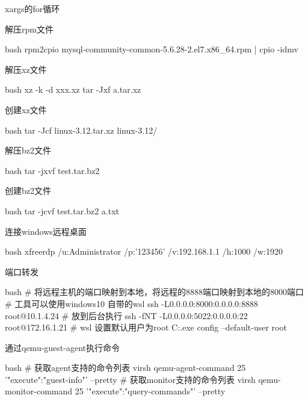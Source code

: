 \begin{outline}[enumerate]
\1 xargs的for循环

\1 解压rpm文件
\begin{code-block}{bash}
rpm2cpio mysql-community-common-5.6.28-2.el7.x86_64.rpm | cpio -idmv
\end{code-block}

\1 解压xz文件
\begin{code-block}{bash}
xz -k -d xxx.xz
tar -Jxf a.tar.xz
\end{code-block}

\1 创建xz文件
\begin{code-block}{bash}
tar -Jcf linux-3.12.tar.xz linux-3.12/
\end{code-block}

\1 解压bz2文件
\begin{code-block}{bash}
tar -jxvf test.tar.bz2
\end{code-block}

\1 创建bz2文件
\begin{code-block}{bash}
tar -jcvf test.tar.bz2 a.txt
\end{code-block}

\1 连接windows远程桌面
\begin{code-block}{bash}
xfreerdp /u:Administrator /p:'123456' /v:192.168.1.1  /h:1000 /w:1920
\end{code-block}

\1 端口转发
\begin{code-block}{bash}
# 将远程主机的端口映射到本地，将远程的8888端口映射到本地的8000端口
# 工具可以使用windows10 自带的wsl
ssh -L0.0.0.0:8000:0.0.0.0:8888 root@10.1.4.24
# 放到后台执行
ssh -fNT -L0.0.0.0:5022:0.0.0.0:22 root@172.16.1.21
# wsl 设置默认用户为root
C:\Users\zhangjl\AppData\Local\Microsoft\WindowsApps\fedoraremix.exe config --default-user root
\end{code-block}

\1 通过qemu-guest-agent执行命令
\begin{code-block}{bash}
# 获取agent支持的命令列表
virsh qemu-agent-command 25 '{"execute":"guest-info"}' --pretty
# 获取monitor支持的命令列表
virsh qemu-monitor-command 25 '{"execute":"query-commands"}' --pretty
\end{code-block}


\end{outline}
